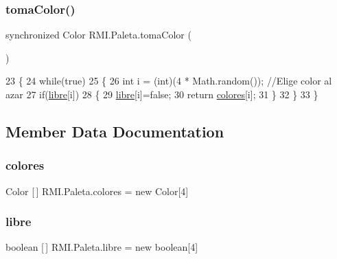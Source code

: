 \subsubsection{\texorpdfstring{toma\+Color()}{tomaColor()}}
{\footnotesize\ttfamily synchronized Color R\+M\+I.\+Paleta.\+toma\+Color (\begin{DoxyParamCaption}{ }\end{DoxyParamCaption})\hspace{0.3cm}{\ttfamily [inline]}}


\begin{DoxyCode}
23     \{
24         \textcolor{keywordflow}{while}(\textcolor{keyword}{true})
25         \{
26             \textcolor{keywordtype}{int} i = (int)(4 * Math.random());    \textcolor{comment}{//Elige color al azar}
27             \textcolor{keywordflow}{if}(\mbox{\hyperlink{class_r_m_i_1_1_paleta_a4b1b7b3121f983b09dfc9daf91620bad}{libre}}[i])
28             \{
29                 \mbox{\hyperlink{class_r_m_i_1_1_paleta_a4b1b7b3121f983b09dfc9daf91620bad}{libre}}[i]=\textcolor{keyword}{false};
30                 \textcolor{keywordflow}{return} \mbox{\hyperlink{class_r_m_i_1_1_paleta_af04daaaad9a19f36a9274f916f450b5a}{colores}}[i];
31             \}
32         \}
33     \}
\end{DoxyCode}


\subsection{Member Data Documentation}
\mbox{\label{class_r_m_i_1_1_paleta_af04daaaad9a19f36a9274f916f450b5a}} 
\subsubsection{\texorpdfstring{colores}{colores}}
{\footnotesize\ttfamily Color \mbox{[}$\,$\mbox{]} R\+M\+I.\+Paleta.\+colores = new Color\mbox{[}4\mbox{]}\hspace{0.3cm}{\ttfamily [private]}}

\mbox{\label{class_r_m_i_1_1_paleta_a4b1b7b3121f983b09dfc9daf91620bad}} 
\subsubsection{\texorpdfstring{libre}{libre}}
{\footnotesize\ttfamily boolean \mbox{[}$\,$\mbox{]} R\+M\+I.\+Paleta.\+libre = new boolean\mbox{[}4\mbox{]}\hspace{0.3cm}{\ttfamily [private]}}

